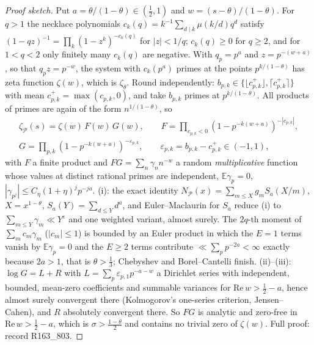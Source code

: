 \documentclass[11pt]{amsart}
\theoremstyle{definition}
\theoremstyle{remark}
\newcommand{\Rel}{\mathrm{Re}\,}
\begin{document}
\begin{proof}[Proof sketch]
Put $a=\theta/(1-\theta)\in(\frac12,1)$ and $w=(s-\theta)/(1-\theta)$. For $q>1$ the necklace polynomials
$c_k(q)=k^{-1}\sum_{d\mid k}\mu(k/d)q^d$ satisfy $(1-qz)^{-1}=\prod_k(1-z^k)^{-c_k(q)}$ for $|z|<1/q$; $c_k(q)\ge0$ for $q\ge2$,
and for $1<q<2$ only finitely many $c_k(q)$ are negative. With $q_p=p^a$ and $z=p^{-(w+a)}$, so that $q_pz=p^{-w}$, the
system with $c_k(p^a)$ primes at the points $p^{k/(1-\theta)}$ has zeta function $\zeta(w)$, which is $\zeta_\theta$. Round
independently: $b_{p,k}\in\{\lfloor c^+_{p,k}\rfloor,\lceil c^+_{p,k}\rceil\}$ with mean $c^+_{p,k}=\max(c_{p,k},0)$, and take
$b_{p,k}$ primes at $p^{k/(1-\theta)}$. All products of primes are again of the form $n^{1/(1-\theta)}$, so
\begin{gather*}
\zeta_{\mathcal P}(s)=\zeta(w)\,F(w)\,G(w),\qquad F=\prod_{c_{p,k}<0}(1-p^{-k(w+a)})^{-|c_{p,k}|},\\
G=\prod_{p,k}(1-p^{-k(w+a)})^{-\varepsilon_{p,k}},\qquad \varepsilon_{p,k}=b_{p,k}-c^+_{p,k}\in(-1,1),
\end{gather*}
with $F$ a finite product and $FG=\sum_n\gamma_nn^{-w}$ a random \emph{multiplicative} function whose values at distinct
rational primes are independent, $\mathbb E\gamma_p=0$, $|\gamma_{p^j}|\le C_\eta(1+\eta)^jp^{-ja}$. (i): the exact identity
$N_{\mathcal P}(x)=\sum_{m\le X}g_mS_a(X/m)$, $X=x^{1-\theta}$, $S_a(Y)=\sum_{d\le Y}d^a$, and Euler--Maclaurin for $S_a$ reduce
(i) to $\sum_{m\le Y}\gamma_m\ll Y^\varepsilon$ and one weighted variant, almost surely. The $2q$-th moment of
$\sum_mc_m\gamma_m$ ($|c_m|\le1$) is bounded by an Euler product in which the $E=1$ terms vanish by $\mathbb E\gamma_p=0$ and the
$E\ge2$ terms contribute $\ll\sum_pp^{-2a}<\infty$ exactly because $2a>1$, that is $\theta>\frac13$; Chebyshev and Borel--Cantelli
finish. (ii)--(iii): $\log G=L+R$ with $L=\sum_p\varepsilon_{p,1}p^{-a-w}$ a Dirichlet series with independent, bounded, mean-zero
coefficients and summable variances for $\Rel w>\frac12-a$, hence almost surely convergent there (Kolmogorov's one-series
criterion, Jensen--Cahen), and $R$ absolutely convergent there. So $FG$ is analytic and zero-free in $\Rel w>\frac12-a$, which
is $\sigma>\frac{1-\theta}2$ and contains no trivial zero of $\zeta(w)$. Full proof: record R163\_803.
\end{proof}
\end{document}
